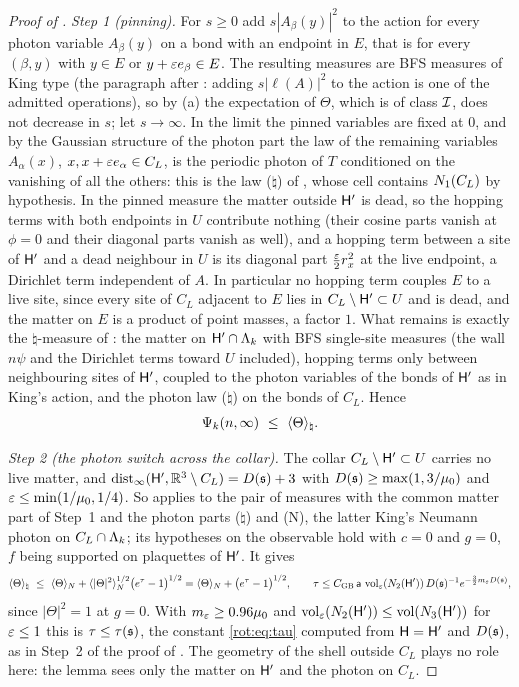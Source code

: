 \begin{proof}[Proof of ]
\emph{Step 1 (pinning).} For $s\ge0$ add $s|A_\beta(y)|^2$ to the action for every photon variable $A_\beta(y)$ on a bond with an endpoint in $E$, that is for every $(\beta,y)$ with $y\in E$ or $y+\varepsilon e_\beta\in E$. The resulting measures are BFS measures of King type (the paragraph after : adding $s|\ell(A)|^2$ to the action is one of the admitted operations), so by (a) the expectation of $\Theta$, which is of class $\mathcal I$, does not decrease in $s$; let $s\to\infty$. In the limit the pinned variables are fixed at $0$, and by the Gaussian structure of the photon part the law of the remaining variables $A_\alpha(x)$, $x,x+\varepsilon e_\alpha\in C_L$, is the periodic photon of $T$ conditioned on the vanishing of all the others: this is the law ($\natural$) of , whose cell contains $N_{1}(C_L)$ by hypothesis. In the pinned measure the matter outside $\mathsf H'$ is dead, so the hopping terms with both endpoints in $U$ contribute nothing (their cosine parts vanish at $\phi=0$ and their diagonal parts vanish as well), and a hopping term between a site of $\mathsf H'$ and a dead neighbour in $U$ is its diagonal part $\frac{\varepsilon}2r_x^2$ at the live endpoint, a Dirichlet term independent of $A$. In particular no hopping term couples $E$ to a live site, since every site of $C_L$ adjacent to $E$ lies in $C_L\setminus\mathsf H'\subset U$ and is dead, and the matter on $E$ is a product of point masses, a factor $1$. What remains is exactly the $\natural$-measure of : the matter on $\mathsf H'\cap\Lambda_k$ with BFS single-site measures (the wall $n\psi$ and the Dirichlet terms toward $U$ included), hopping terms only between neighbouring sites of $\mathsf H'$, coupled to the photon variables of the bonds of $\mathsf H'$ as in King's action, and the photon law ($\natural$) on the bonds of $C_L$. Hence
\[
\Psik(n,\infty)\ \le\ \langle\Theta\rangle_\natural .
\]

\emph{Step 2 (the photon switch across the collar).} The collar $C_L\setminus\mathsf H'\subset U$ carries no live matter, and $\operatorname{dist}_\infty(\mathsf H',\mathbb R^3\setminus C_L)=D(\mathfrak s)+3$ with $D(\mathfrak s)\ge\max(1,3/\mu_0)$ and $\varepsilon\le\min(1/\mu_0,1/4)$. So  applies to the pair of measures with the common matter part of Step~1 and the photon parts ($\natural$) and (N), the latter King's Neumann photon on $C_L\cap\Lambda_k$; its hypotheses on the observable hold with $c=0$ and $g=0$, $f$ being supported on plaquettes of $\mathsf H'$. It gives
\[
\langle\Theta\rangle_\natural\ \le\ \langle\Theta\rangle_N+\langle|\Theta|^2\rangle_N^{1/2}\big(e^{\tau}-1\big)^{1/2}
=\langle\Theta\rangle_N+\big(e^{\tau}-1\big)^{1/2},\qquad
\tau\le C_{\rm GB}\,\srw\,\vol_\eps(\Nr2{\Hboxp})\,D(\fs)^{-1}e^{-\frac32m_\eps D(\fs)},
\]
since $|\Theta|^2=1$ at $g=0$. With $m_{\varepsilon}\ge0.96\mu_0$ and $\operatorname{vol}_{\varepsilon}(N_{2}(\mathsf H'))\le\operatorname{vol}(N_{3}(\mathsf H'))$ for $\varepsilon\le1$ this is $\tau\le\tau(\mathfrak s)$, the constant \eqref{rot:eq:tau} computed from $\mathsf H=\mathsf H'$ and $D(\mathfrak s)$, as in Step~2 of the proof of . The geometry of the shell outside $C_L$ plays no role here: the lemma sees only the matter on $\mathsf H'$ and the photon on $C_L$.


\end{proof}
